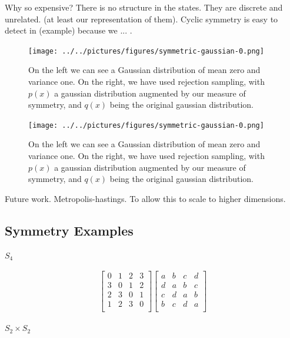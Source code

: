 Why so expensive? There is no structure in the states. They are discrete and unrelated.
(at least our representation of them). Cyclic symmetry is easy to detect in (example) because
we ... .

\begin{figure}[h!]
  \centering
  \texttt{[image: ../../pictures/figures/symmetric-gaussian-0.png]}
  \caption{On the left we can see a Gaussian distribution of mean zero and variance one.
  On the right, we have used rejection sampling, with $p(x)$ a gaussian
  distribution augmented by our measure of symmetry, and $q(x)$ being the original gaussian distribution.}
\end{figure}

\begin{figure}[h!]
  \centering
  \texttt{[image: ../../pictures/figures/symmetric-gaussian-0.png]}
  \caption{On the left we can see a Gaussian distribution of mean zero and variance one.
  On the right, we have used rejection sampling, with $p(x)$ a gaussian
  distribution augmented by our measure of symmetry, and $q(x)$ being the original gaussian distribution.}
\end{figure}

Future work.
Metropolis-hastings. To allow this to scale to higher dimensions.

\subsection{Symmetry Examples}

$S_4$

 \begin{align*}
  \begin{bmatrix}
    0 & 1 & 2 & 3 \\
    3 & 0 & 1 & 2 \\
    2 & 3 & 0 & 1 \\
    1 & 2 & 3 & 0 \\
  \end{bmatrix}
  \begin{bmatrix}
    a & b & c & d \\
    d & a & b & c \\
    c & d & a & b \\
    b & c & d & a \\
  \end{bmatrix}
 \end{align*}

$S_2 \times S_2$

